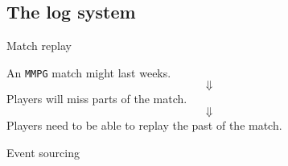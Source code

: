 \documentclass{beamer}
\begin{document}
\subsection{The log system}
\begin{frame}{Match replay}
\begin{center}
An \texttt{MMPG} match might last weeks.
      $$\Downarrow$$
      Players will miss parts of the match.
      $$\Downarrow$$
      Players need to be able to replay the past of the match.
\end{center}
\end{frame}
\begin{frame}{Event sourcing}
\end{frame}
\end{document}
